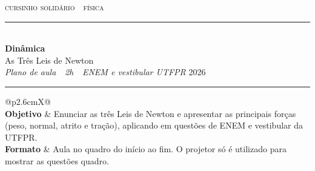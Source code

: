 \documentclass[11pt,a4paper]{article}
\begin{document}

\thispagestyle{empty}

{\scshape\color{vinho}cursinho solid\'ario \,\textperiodcentered\, f\'isica}\\[-0.5em]
{\color{vinho}\rule{\linewidth}{1.6pt}}\\[0.9em]
{\huge\bfseries Din\^amica}\\[0.35em]
{\LARGE As Tr\^es Leis de Newton}\\[0.7em]
{\itshape\color{grafite}Plano de aula \,\textperiodcentered\, 2h
 \,\textperiodcentered\, ENEM e vestibular UTFPR}
\hfill {\color{grafite}2026}\\[-0.3em]
{\color{black!30}\rule{\linewidth}{0.5pt}}

\vspace{1.2em}

{\renewcommand{\arraystretch}{1.45}
\begin{tabularx}{\linewidth}{@{}p{2.6cm}X@{}}
  \\
  \addlinespace[2pt]
  \toprule
  \textbf{Objetivo} & Enunciar as tr\^es Leis de Newton e apresentar as
    principais for\c{c}as (peso, normal, atrito e tra\c{c}\~ao),
    aplicando em quest\~oes de ENEM e vestibular da UTFPR. \\
  \textbf{Formato} & Aula no quadro do in\'icio ao fim. O projetor s\'o
    é utilizado para mostrar as quest\~oes quadro. \\
  \bottomrule
\end{tabularx}}

\vspace{1.4em}
\end{document}
